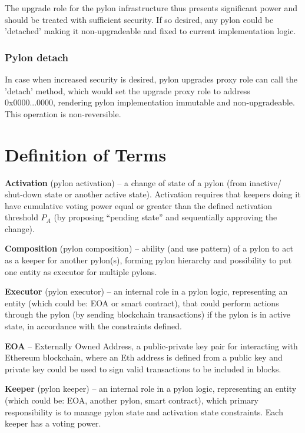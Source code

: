 \documentclass[12pt]{article}
\begin{document}
The upgrade role for the pylon infrastructure thus presents significant power and should be treated with sufficient security. If so desired, any pylon could be 'detached' making it non-upgradeable and fixed to current implementation logic.

\subsubsection{Pylon detach}

In case when increased security is desired, pylon upgrades proxy role can call the 'detach' method, which would set the upgrade proxy role to address 0x0000...0000, rendering pylon implementation immutable and non-upgradeable. This operation is non-reversible.


\pagebreak
\section{Definition of Terms}

\smallskip
\noindent \textbf{Activation} (pylon activation) -- a change of state of a pylon (from inactive/ shut-down state or another active state). Activation requires that keepers doing it have cumulative voting power equal or greater than the defined activation threshold $P_A$ (by proposing ``pending state'' and sequentially approving the change).

\smallskip
\noindent \textbf{Composition} (pylon composition) -- ability (and use pattern) of a pylon to act as a keeper for another pylon(s), forming pylon hierarchy and possibility to put one entity as executor for multiple pylons.

\smallskip
\noindent \textbf{Executor} (pylon executor) -- an internal role in a pylon logic, representing an entity (which could be: EOA or smart contract), that could perform actions through the pylon (by sending blockchain transactions) if the pylon is in active state, in accordance with the constraints defined.

\smallskip
\noindent \textbf{EOA} -- Externally Owned Address, a public-private key pair for interacting with Ethereum blockchain, where an Eth address is defined from a public key and private key could be used to sign valid transactions to be included in blocks.

\smallskip
\noindent \textbf{Keeper} (pylon keeper) -- an internal role in a pylon logic, representing an entity (which could be: EOA, another pylon, smart contract), which primary responsibility is to manage pylon state and activation state constraints. Each keeper has a voting power.
\end{document}
